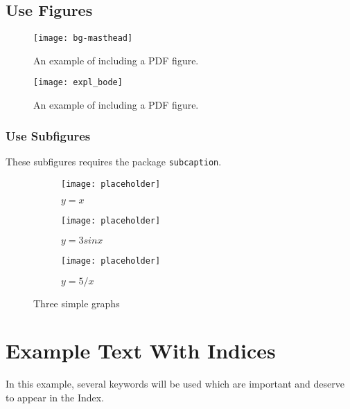 \newpage

\subsection{Use Figures}

\begin{figure}[h!]
  \centering
  \texttt{[image: bg-masthead]}
  \caption{An example of including a PDF figure.}
  \label{fig:expl_master}
\end{figure}

\begin{figure}[h!]
  \centering
  \texttt{[image: expl\_bode]}
  \caption{An example of including a PDF figure.}
  \label{fig:expl_bode}
\end{figure}
\clearpage

\subsubsection{Use Subfigures}
These subfigures requires the package \texttt{subcaption}.

\begin{figure}[h!]
     \centering
     \begin{subfigure}[b]{0.3\textwidth}
         \centering
         \texttt{[image: placeholder]}
         \caption{$y=x$}
         \label{fig:y equals x}
     \end{subfigure}
     \hfill
     \begin{subfigure}[b]{0.3\textwidth}
         \centering
         \texttt{[image: placeholder]}
         \caption{$y=3sinx$}
         \label{fig:three sin x}
     \end{subfigure}
     \hfill
     \begin{subfigure}[b]{0.3\textwidth}
         \centering
         \texttt{[image: placeholder]}
         \caption{$y=5/x$}
         \label{fig:five over x}
     \end{subfigure}
        \caption{Three simple graphs}
        \label{fig:three graphs}
\end{figure}


\section{Example Text With Indices}
In this example, several keywords will be used 
which are important and deserve to appear in the Index.

